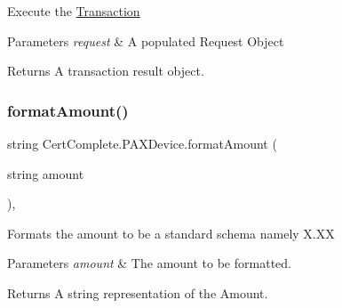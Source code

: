 \begin{DoxyEnumerate}
\item Execute the \mbox{\hyperlink{class_cert_complete_1_1_transaction}{Transaction}} 
\end{DoxyEnumerate}


\begin{DoxyParams}{Parameters}
{\em request} & A populated Request Object\\
\hline
\end{DoxyParams}
\begin{DoxyReturn}{Returns}
A transaction result object.
\end{DoxyReturn}
\mbox{\label{class_cert_complete_1_1_p_a_x_device_a1abb8bb168000ff0cb11399c6c8c5f1a}} 
\subsubsection{\texorpdfstring{format\+Amount()}{formatAmount()}}
{\footnotesize\ttfamily string Cert\+Complete.\+P\+A\+X\+Device.\+format\+Amount (\begin{DoxyParamCaption}\item[{string}]{amount }\end{DoxyParamCaption})\hspace{0.3cm}{\ttfamily [inline]}, {\ttfamily [private]}}



Formats the amount to be a standard schema namely X.\+XX 


\begin{DoxyParams}{Parameters}
{\em amount} & The amount to be formatted.\\
\hline
\end{DoxyParams}
\begin{DoxyReturn}{Returns}
A string representation of the Amount.
\end{DoxyReturn}
\mbox{\label{class_cert_complete_1_1_p_a_x_device_a527f014f8af57586caf64ec0af8f4eb9}} 
